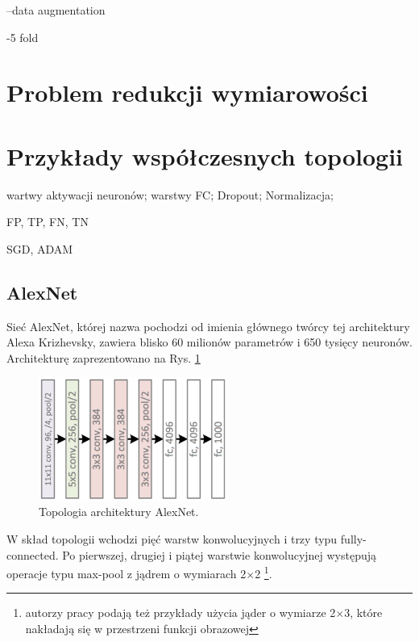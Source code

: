 --data augmentation


-5 fold
\section{Problem redukcji wymiarowości}

\section{Przykłady współczesnych topologii}


wartwy aktywacji neuronów;
warstwy FC;
Dropout;
Normalizacja;

FP, TP, FN, TN

SGD, ADAM

\subsection{AlexNet}
\label{AlexNet}
Sieć AlexNet, której nazwa pochodzi od imienia głównego twórcy tej architektury Alexa Krizhevsky, zawiera blisko 60 milionów parametrów i 650 tysięcy neuronów. Architekturę zaprezentowano na Rys. \ref{AlexNetTopology}
\begin{figure}[h!]
	\centering
	\includegraphics[width=0.55\textwidth]{figures/AlexNet.png}
	\caption{Topologia architektury AlexNet.}
	\label{AlexNetTopology}
\end{figure}

W skład topologii wchodzi pięć warstw konwolucyjnych i trzy typu fully-connected. Po pierwszej, drugiej i piątej warstwie konwolucyjnej występują operacje typu max-pool z jądrem o wymiarach 2$\times$2 \footnote{autorzy pracy podają też przykłady użycia jąder o wymiarze 2$\times$3, które nakładają się w przestrzeni funkcji obrazowej}. 

